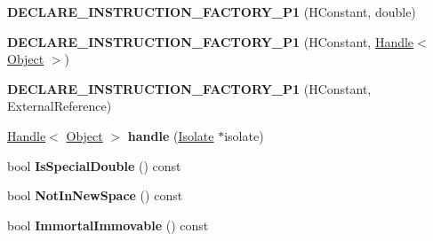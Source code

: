 \begin{DoxyCompactItemize}
\item 
\hypertarget{classv8_1_1internal_1_1_v8___f_i_n_a_l_a7424ddcc4f581444a020e7b8b7bfe5ef}{}{\bfseries D\+E\+C\+L\+A\+R\+E\+\_\+\+I\+N\+S\+T\+R\+U\+C\+T\+I\+O\+N\+\_\+\+F\+A\+C\+T\+O\+R\+Y\+\_\+\+P1} (H\+Constant, double)\label{classv8_1_1internal_1_1_v8___f_i_n_a_l_a7424ddcc4f581444a020e7b8b7bfe5ef}

\item 
\hypertarget{classv8_1_1internal_1_1_v8___f_i_n_a_l_ae2b509857f7bd2f4a0ba80911fd7763f}{}{\bfseries D\+E\+C\+L\+A\+R\+E\+\_\+\+I\+N\+S\+T\+R\+U\+C\+T\+I\+O\+N\+\_\+\+F\+A\+C\+T\+O\+R\+Y\+\_\+\+P1} (H\+Constant, \hyperlink{classv8_1_1internal_1_1_handle}{Handle}$<$ \hyperlink{classv8_1_1internal_1_1_object}{Object} $>$)\label{classv8_1_1internal_1_1_v8___f_i_n_a_l_ae2b509857f7bd2f4a0ba80911fd7763f}

\item 
\hypertarget{classv8_1_1internal_1_1_v8___f_i_n_a_l_a3cf0c207dc9813283872d2e846a3130a}{}{\bfseries D\+E\+C\+L\+A\+R\+E\+\_\+\+I\+N\+S\+T\+R\+U\+C\+T\+I\+O\+N\+\_\+\+F\+A\+C\+T\+O\+R\+Y\+\_\+\+P1} (H\+Constant, External\+Reference)\label{classv8_1_1internal_1_1_v8___f_i_n_a_l_a3cf0c207dc9813283872d2e846a3130a}

\item 
\hypertarget{classv8_1_1internal_1_1_v8___f_i_n_a_l_a6429f3d67327c60641b9735cd539336d}{}\hyperlink{classv8_1_1internal_1_1_handle}{Handle}$<$ \hyperlink{classv8_1_1internal_1_1_object}{Object} $>$ {\bfseries handle} (\hyperlink{classv8_1_1internal_1_1_isolate}{Isolate} $\ast$isolate)\label{classv8_1_1internal_1_1_v8___f_i_n_a_l_a6429f3d67327c60641b9735cd539336d}

\item 
\hypertarget{classv8_1_1internal_1_1_v8___f_i_n_a_l_a4cd7b9a35fbcd2f42f47b7e92d5ca9b5}{}bool {\bfseries Is\+Special\+Double} () const \label{classv8_1_1internal_1_1_v8___f_i_n_a_l_a4cd7b9a35fbcd2f42f47b7e92d5ca9b5}

\item 
\hypertarget{classv8_1_1internal_1_1_v8___f_i_n_a_l_a373f4544100985bfb7f006f5c6f9f2ed}{}bool {\bfseries Not\+In\+New\+Space} () const \label{classv8_1_1internal_1_1_v8___f_i_n_a_l_a373f4544100985bfb7f006f5c6f9f2ed}

\item 
\hypertarget{classv8_1_1internal_1_1_v8___f_i_n_a_l_a48180348720093b4def82c017df36b0c}{}bool {\bfseries Immortal\+Immovable} () const \label{classv8_1_1internal_1_1_v8___f_i_n_a_l_a48180348720093b4def82c017df36b0c}


\end{DoxyCompactItemize}
